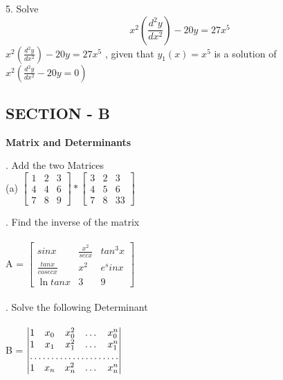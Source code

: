 \documentclass{article}
\begin{document}
\large 5. Solve 
\begin{equation*}
    x^2 (\frac{d^2y}{dx^2}) - 20y = 27x^5 
\end{equation*}
$x^2 (\frac{d^2y}{dx^2}) - 20y = 27x^5 $
, given that $y_1(x) = x^5$ is a solution of $x^2(\frac{d^2y}{dx^2} - 20y = 0)$

\newpage

\vspace{10mm}
\subsection{SECTION - B}
\large \textbf{Matrix and Determinants}
\vspace{12mm}

. Add the two Matrices\\

(a)
$\begin{bmatrix}
1 & 2 & 3\\
4 & 4 & 6\\
7 & 8 & 9
\end{bmatrix}
* 
\begin{bmatrix}
3 & 2 & 3\\
4 & 5 & 6\\
7 & 8 & 33
\end{bmatrix}$



\vspace{10mm}
. Find the inverse of the matrix \\\\
\indent A =
$\begin{bmatrix}
sinx & \frac{x^2}{secx} & tan^3x\\
\frac{tanx}{cosecx} & x^2 & e^sinx\\
\ln{tanx} & 3 & 9

\end{bmatrix}$\\\\

. Solve the following Determinant\\\\
\indent B = 
$\begin{vmatrix}
1 & x_{0} & x_{0}^{2} & \dots & x_{0}^{n} \\ 
1 & x_{1} & x_{1}^{2} & \dots & x_{1}^{n} \\
\hdotsfor{5} \\
1 & x_{n} & x_{n}^{2} & \dots & x_{n}^{n}
\end{vmatrix}$
\end{document}

